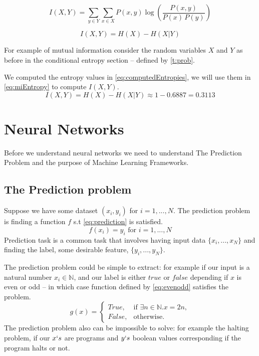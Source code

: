 \documentclass[dissertation.tex]{subfiles}
\begin{document}
\begin{equation}
      I(X,Y)=\sum _{y\in Y}\sum _{x\in X}{P(x,y)\log {\left({\frac
      {P(x,y)}{P(x)\,P(y)}}\right)}} 
\label{eq:miExplicit}
\end{equation}

\begin{equation}
  I(X, Y) = H(X) - H(X|Y)
\label{eq:miEntropy}
\end{equation}

For example of mutual information consider the random variables $X$ and $Y$ as
before in the conditional entropy section -- defined by \autoref{t:prob}. 

We computed the entropy values in \autoref{eq:computedEntropies}, we will use
them in \autoref{eq:miEntropy} to compute $I(X,Y)$.
\begin{equation}
  I(X,Y) = H(X) - H(X|Y) \approx 1 - 0.6887 = 0.3113
\end{equation}

\section{Neural Networks}
\label{sec:NN}

Before we understand neural networks we need to understand The Prediction
Problem and the purpose of Machine Learning Frameworks.

\subsection{The Prediction problem} 

Suppose we have some dataset $(x_i, y_i)$ for $i = 1,...,N$. The prediction
problem is finding a function $f$ s.t \autoref{eq:prediction} is satisfied.
\begin{equation}
  f(x_i) = y_i \text{ for } i = 1,...,N
  \label{eq:prediction}
\end{equation}
Prediction task is a common task that involves having input data
$\{x_i,...,x_N\}$ and finding the label, some desirable feature,
$\{y_i,...,y_N\}$. 

The prediction problem could be simple to extract: for example if our input is a
natural number $x_i\in\mathbb{N}$, and our label is either $true$ or $false$
depending if $x$ is even or odd -- in which case function defined by
\autoref{eq:evenodd} satisfies the problem.  \begin{equation}
  g(x) = \begin{cases}
    True, & \text{if } \exists n\in\mathbb{N}.x = 2n , \\
    False, & \text{otherwise}.
  \end{cases}
\label{eq:evenodd}
\end{equation}
The prediction problem also can be impossible to solve: for example the halting
problem, if our $x`s$ are programs and $y`s$ boolean values corresponding if the
program halts or not.
\end{document}
